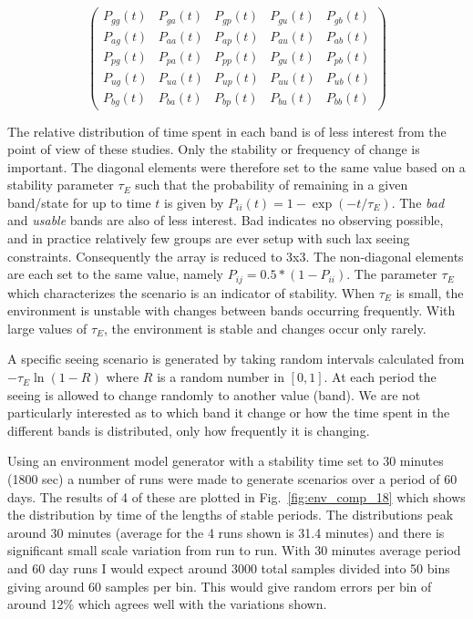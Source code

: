\begin{equation}
 \left( 
\begin{array}{ccccc}
  P_{gg}(t) & P_{ga}(t) & P_{gp}(t) & P_{gu}(t) & P_{gb}(t)\\
  P_{ag}(t) & P_{aa}(t) & P_{ap}(t) & P_{au}(t) & P_{ab}(t)\\
  P_{pg}(t) & P_{pa}(t) & P_{pp}(t) & P_{gu}(t) & P_{pb}(t)\\
  P_{ug}(t) & P_{ua}(t) & P_{up}(t) & P_{uu}(t) & P_{ub}(t)\\
  P_{bg}(t) & P_{ba}(t) & P_{bp}(t) & P_{bu}(t) & P_{bb}(t)

\end{array} 
\right)
\end{equation}

 The relative distribution of time spent in each band is of less interest from the point of view of these studies. Only the stability or frequency of change is important.  The diagonal elements were therefore set to the same value based on a stability parameter $\tau_E$ such that the probability of remaining in a given band/state for up to time $t$ is given by $P_{ii}(t) = 1 - \exp{(-t/\tau_E)}$. The \emph{bad} and \emph{usable} bands are also of less interest. Bad indicates no observing possible, and in practice relatively few groups are ever setup with such lax seeing constraints. Consequently the array is reduced to 3x3. The non-diagonal elements are each set to the same value, namely $P_{ij} = 0.5*(1 - P_{ii})$. The parameter $\tau_E$ which characterizes the scenario is an indicator of stability. When $\tau_E$ is small, the environment is unstable with changes between bands occurring frequently. With large values of $\tau_E$, the environment is stable and changes occur only rarely.

A specific seeing scenario is generated by taking random intervals calculated from $-\tau_E \ln{(1-R)}$ where $R$ is a random number in $[0,1]$. At each period the seeing is allowed to change randomly to another value (band). We are not particularly interested as to which band it change or how the time spent in the different bands is distributed, only how frequently it is changing. 

Using an environment model generator with a stability time set to 30 minutes (1800 sec) a number of runs were made to generate scenarios over a period of 60 days. The results of 4 of these are plotted in Fig.~\ref{fig:env_comp_18} which shows the distribution by time of the lengths of stable periods. The distributions peak around 30 minutes (average for the 4 runs shown is 31.4 minutes) and there is significant small scale variation from run to run. With 30 minutes average period and 60 day runs I would expect around 3000 total samples divided into 50 bins giving around 60 samples per bin. This would give random errors per bin of around 12\% which agrees well with the variations shown.

